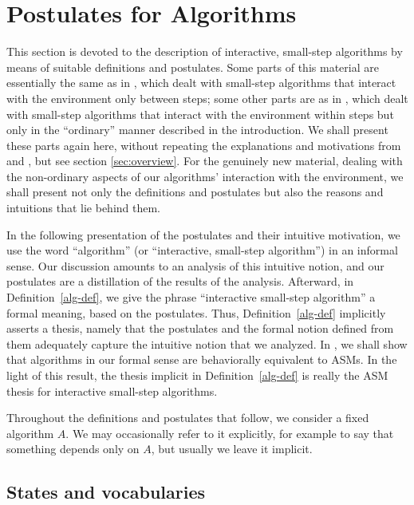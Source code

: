 \documentclass{LMCS}
\theoremstyle{definition}
\begin{document}
\section{Postulates for Algorithms}\label{post}

This section is devoted to the description of interactive,
small-step algorithms by means of suitable definitions and
postulates.  Some parts of this material are essentially the same as
in \cite{seqth}, which dealt with small-step algorithms that
interact with the environment only between steps; some other parts
are as in \cite{oa1}, which dealt with small-step algorithms that
interact with the environment within steps but only in the
``ordinary'' manner described in the introduction.  We shall present
these parts again here, without repeating the explanations and
motivations from \cite{seqth} and \cite{oa1}, but see section
\ref{sec:overview}. For the genuinely new material, dealing with the
non-ordinary aspects of our algorithms' interaction with the
environment, we shall present not only the definitions and
postulates but also the reasons and intuitions that lie behind them.

In the following presentation of the postulates and their intuitive
motivation, we use the word ``algorithm'' (or ``interactive,
small-step algorithm'') in an informal sense.  Our discussion amounts
to an analysis of this intuitive notion, and our postulates are a
distillation of the results of the analysis.  Afterward, in
Definition~\ref{alg-def}, we give the phrase ``interactive small-step
algorithm'' a formal meaning, based on the postulates.  Thus,
Definition~\ref{alg-def} implicitly asserts a thesis, namely that the
postulates and the formal notion defined from them adequately capture
the intuitive notion that we analyzed.  In \cite{ga2}, we shall show
that algorithms in our formal sense are behaviorally equivalent to
ASMs.  In the light of this result, the thesis implicit in
Definition~\ref{alg-def} is really the ASM thesis for interactive
small-step algorithms.

Throughout the definitions and postulates that follow, we consider a
fixed algorithm $A$.  We may occasionally refer to it explicitly, for
example to say that something depends only on $A$, but usually we
leave it implicit.

\subsection{States and vocabularies}
\end{document}

